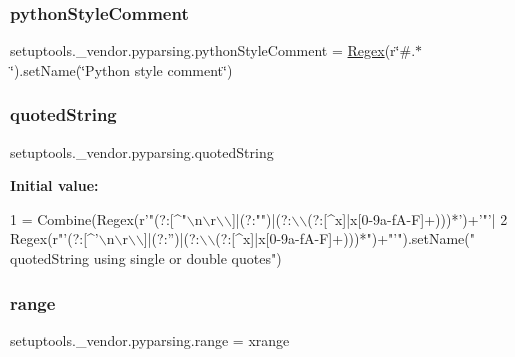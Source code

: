 \subsubsection{\texorpdfstring{python\+Style\+Comment}{pythonStyleComment}}
{\footnotesize\ttfamily setuptools.\+\_\+vendor.\+pyparsing.\+python\+Style\+Comment = \hyperlink{classsetuptools_1_1__vendor_1_1pyparsing_1_1_regex}{Regex}(r\char`\"{}\#.$\ast$\char`\"{}).set\+Name(\char`\"{}Python style comment\char`\"{})}

\mbox{\label{namespacesetuptools_1_1__vendor_1_1pyparsing_a3601fc46de4b69d173c0a1b5afe65228}} 
\subsubsection{\texorpdfstring{quoted\+String}{quotedString}}
{\footnotesize\ttfamily setuptools.\+\_\+vendor.\+pyparsing.\+quoted\+String}

{\bfseries Initial value\+:}
\begin{DoxyCode}
1 =  Combine(Regex(\textcolor{stringliteral}{r'"(?:[^"\(\backslash\)n\(\backslash\)r\(\backslash\)\(\backslash\)]|(?:"")|(?:\(\backslash\)\(\backslash\)(?:[^x]|x[0-9a-fA-F]+)))*'})+\textcolor{stringliteral}{'"'}|
2                        Regex(\textcolor{stringliteral}{r"'(?:[^'\(\backslash\)n\(\backslash\)r\(\backslash\)\(\backslash\)]|(?:'')|(?:\(\backslash\)\(\backslash\)(?:[^x]|x[0-9a-fA-F]+)))*"})+\textcolor{stringliteral}{"'"}).setName(\textcolor{stringliteral}{"
      quotedString using single or double quotes"})
\end{DoxyCode}
\mbox{\label{namespacesetuptools_1_1__vendor_1_1pyparsing_a4a3e8a165b7a3aac7b6f83975ee1beac}} 
\subsubsection{\texorpdfstring{range}{range}}
{\footnotesize\ttfamily setuptools.\+\_\+vendor.\+pyparsing.\+range = xrange}

